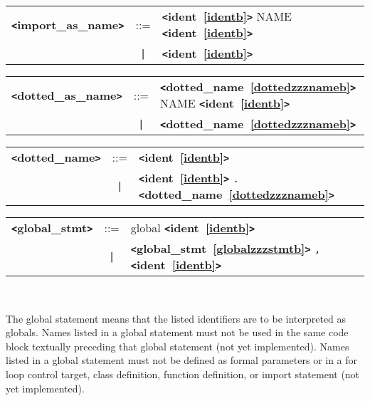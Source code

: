 \documentclass[12pt]{article}
\begin{document}
\label{importzzzaszzznameb}
\begin{tabular}{lcl}
{\bf \verb+<+import\_as\_name\verb+>+} & ::=  & {\bf \verb+<+ident~\ref{identb}\verb+>+}  NAME {\bf \verb+<+ident~\ref{identb}\verb+>+}  \\
 & \verb+|+  & {\bf \verb+<+ident~\ref{identb}\verb+>+}  \\
\end{tabular}

\label{dottedzzzaszzznameb}
\begin{tabular}{lcl}
{\bf \verb+<+dotted\_as\_name\verb+>+} & ::=  & {\bf \verb+<+dotted\_name~\ref{dottedzzznameb}\verb+>+}  NAME {\bf \verb+<+ident~\ref{identb}\verb+>+}  \\
 & \verb+|+  & {\bf \verb+<+dotted\_name~\ref{dottedzzznameb}\verb+>+}  \\
\end{tabular}

\label{dottedzzznameb}
\begin{tabular}{lcl}
{\bf \verb+<+dotted\_name\verb+>+} & ::=  & {\bf \verb+<+ident~\ref{identb}\verb+>+}  \\
 & \verb+|+  & {\bf \verb+<+ident~\ref{identb}\verb+>+}  \verb|.| {\bf \verb+<+dotted\_name~\ref{dottedzzznameb}\verb+>+}  \\
\end{tabular}

\label{globalzzzstmtb}
\begin{tabular}{lcl}
{\bf \verb+<+global\_stmt\verb+>+} & ::=  & global {\bf \verb+<+ident~\ref{identb}\verb+>+}  \\
 & \verb+|+  & {\bf \verb+<+global\_stmt~\ref{globalzzzstmtb}\verb+>+}  \verb|,| {\bf \verb+<+ident~\ref{identb}\verb+>+}  \\
\end{tabular} \\


The global statement means that the listed identifiers are to be interpreted as globals.
Names listed in a global statement must not be used in the same code block 
textually preceding that global statement (not yet implemented). Names listed in a global statement must not be defined as formal parameters or in a for loop control target, class definition, function definition, or import statement (not yet implemented).
\end{document}
